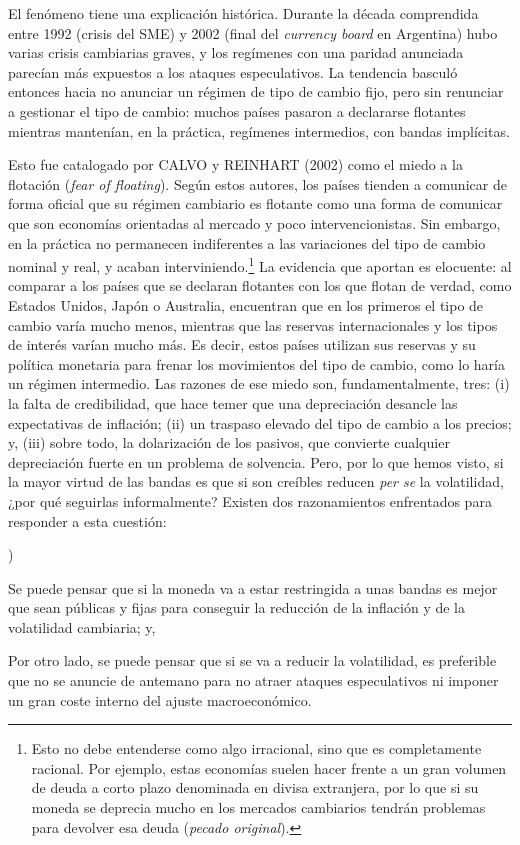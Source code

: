 \documentclass[10pt,a4paper]{article}
\newcounter{alphaitem}
\newenvironment{la}
      {\begin{list}{\alph{alphaitem})}{%
          \usecounter{alphaitem}%
          \setlength{\leftmargin}{1cm}%
          \setlength{\parskip}{3pt}%
          \setlength{\itemsep}{0pt}%
          \setlength{\parsep}{0pt}%
      }}
      {\end{list}}
\begin{document}
El fenómeno tiene una explicación histórica. Durante la década comprendida entre 1992 (crisis del SME) y 2002 (final del \textit{currency board} en Argentina) hubo varias crisis cambiarias graves, y los regímenes con una paridad anunciada parecían más expuestos a los ataques especulativos. La tendencia basculó entonces hacia no anunciar un régimen de tipo de cambio fijo, pero sin renunciar a gestionar el tipo de cambio: muchos países pasaron a declararse flotantes mientras mantenían, en la práctica, regímenes intermedios, con bandas implícitas.

Esto fue catalogado por CALVO y REINHART (2002) como el miedo a la flotación (\textit{fear of floating}). Según estos autores, los países tienden a comunicar de forma oficial que su régimen cambiario es flotante como una forma de comunicar que son economías orientadas al mercado y poco intervencionistas. Sin embargo, en la práctica no permanecen indiferentes a las variaciones del tipo de cambio nominal y real, y acaban interviniendo.\footnote{%
    Esto no debe entenderse como algo irracional, sino que es completamente racional. Por ejemplo, estas economías suelen hacer frente a un gran volumen de deuda a corto plazo denominada en divisa extranjera, por lo que si su moneda se deprecia mucho en los mercados cambiarios tendrán problemas para devolver esa deuda (\textit{pecado original}).
} La evidencia que aportan es elocuente: al comparar a los países que se declaran flotantes con los que flotan de verdad, como Estados Unidos, Japón o Australia, encuentran que en los primeros el tipo de cambio varía mucho menos, mientras que las reservas internacionales y los tipos de interés varían mucho más. Es decir, estos países utilizan sus reservas y su política monetaria para frenar los movimientos del tipo de cambio, como lo haría un régimen intermedio. Las razones de ese miedo son, fundamentalmente, tres: (i) la falta de credibilidad, que hace temer que una depreciación desancle las expectativas de inflación; (ii) un traspaso elevado del tipo de cambio a los precios; y, (iii) sobre todo, la dolarización de los pasivos, que convierte cualquier depreciación fuerte en un problema de solvencia. Pero, por lo que hemos visto, si la mayor virtud de las bandas es que si son creíbles reducen \textit{per se} la volatilidad, ¿por qué seguirlas informalmente? Existen dos razonamientos enfrentados para responder a esta cuestión:
\begin{la}
    \item Se puede pensar que si la moneda va a estar restringida a unas bandas es mejor que sean públicas y fijas para conseguir la reducción de la inflación y de la volatilidad cambiaria; y,
    \item Por otro lado, se puede pensar que si se va a reducir la volatilidad, es preferible que no se anuncie de antemano para no atraer ataques especulativos ni imponer un gran coste interno del ajuste macroeconómico.
\end{la}
\end{document}
